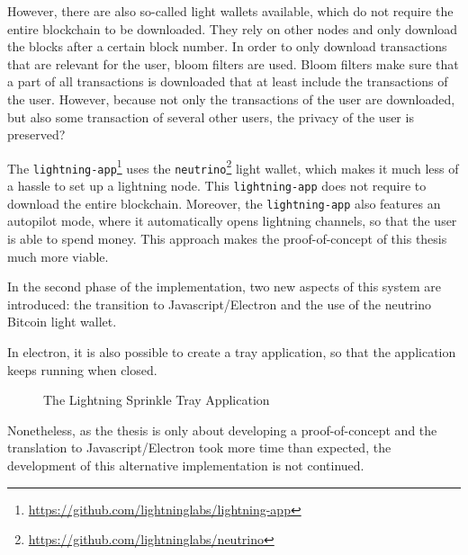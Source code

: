 However, there are also so-called light wallets available, which do not require the entire blockchain to be downloaded. They rely on other nodes and only download the blocks after a certain block number. In order to only download transactions that are relevant for the user, bloom filters are used. Bloom filters make sure that a part of all transactions is downloaded that at least include the transactions of the user. However, because not only the transactions of the user are downloaded, but also some transaction of several other users, the privacy of the user is preserved?

The \texttt{lightning-app}\footnote{\url{https://github.com/lightninglabs/lightning-app}} uses the \texttt{neutrino}\footnote{\url{https://github.com/lightninglabs/neutrino}} light wallet, which makes it much less of a hassle to set up a lightning node. This \texttt{lightning-app} does not require to download the entire blockchain. Moreover, the \texttt{lightning-app} also features an autopilot mode, where it automatically opens lightning channels, so that the user is able to spend money. This approach makes the proof-of-concept of this thesis much more viable. 

In the second phase of the implementation, two new aspects of this system are introduced: the transition to Javascript/Electron and the use of the neutrino Bitcoin light wallet.

In electron, it is also possible to create a tray application, so that the application keeps running when closed. 


\begin{figure}[h!]
  \setlength{\fboxsep}{0pt}%
  \center
  \caption{The Lightning Sprinkle Tray Application}
\end{figure}

Nonetheless, as the thesis is only about developing a proof-of-concept and the translation to Javascript/Electron took more time than expected, the development of this alternative implementation is not continued.

